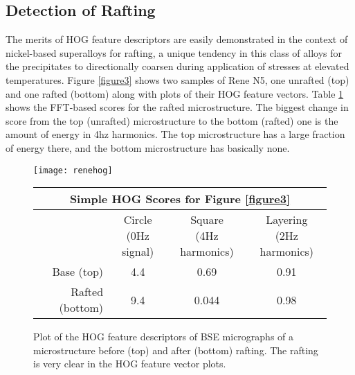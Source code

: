 \documentclass[review]{elsarticle}
\begin{document}
	\subsection{Detection of Rafting}
	The merits of HOG feature descriptors are easily demonstrated in the context of nickel-based superalloys for rafting, a unique tendency in this class of alloys for the precipitates to directionally coarsen during application of stresses at elevated temperatures. Figure \ref{figure3} shows two samples of Rene N5, one unrafted (top) and one rafted (bottom) along with plots of their HOG feature vectors. Table \ref{table2} shows the FFT-based scores for the rafted microstructure. The biggest change in score from the top (unrafted) microstructure to the bottom (rafted) one is the amount of energy in 4hz harmonics. The top microstructure has a large fraction of energy there, and the bottom microstructure has basically none.
	
	\begin{figure}[!ht]
		\begin{center}
			\texttt{[image: renehog]}
	  		\caption{ Plot of the HOG feature descriptors of BSE micrographs of a microstructure before (top) and after (bottom) rafting. The rafting is very clear in the HOG feature vector plots. }
	  		\label{figure3}
  		
			\begin{tabular}{ r | c | c | c }
				\multicolumn{4}{c}{Simple HOG Scores for Figure \ref{figure3}} \\
				\hline
				& \shortstack{Circle \\ (0Hz signal)} & \shortstack{Square \\ (4Hz harmonics)} & \shortstack{Layering \\ (2Hz harmonics)} \\
				\hline
				Base (top) & 4.4 & 0.69 & 0.91 \\
				Rafted (bottom) & 9.4 & 0.044 & 0.98 \\
				\hline
			\end{tabular}
			
	  		\label{table2}
		\end{center}
	\end{figure}
	
\end{document}
